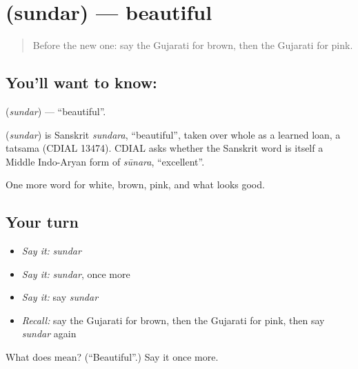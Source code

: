 \section[\texorpdfstring{\gu{સુંદર} (sundar)}{સુંદર (sundar)}]{ (sundar) — beautiful}

\label{lesson:GU-C71-beautiful}



\begin{quote}
Before the new one: say the Gujarati for brown, then the Gujarati for pink.
\end{quote}

\subsection*{You'll want to know: }
\textbf{} (\emph{sundar}) — \textquotedblleft{}beautiful\textquotedblright{}.

\begin{cousinweb}
\textbf{} (\emph{sundar}) is Sanskrit \emph{sundara}, \textquotedblleft{}beautiful\textquotedblright{}, taken over whole as a learned loan, a tatsama (CDIAL 13474). CDIAL asks whether the Sanskrit word is itself a Middle Indo-Aryan form of \emph{sūnara}, \textquotedblleft{}excellent\textquotedblright{}.
\end{cousinweb}

\begin{grammarlens}[title={What you've built}]
One more word for white, brown, pink, and what looks good.
\end{grammarlens}

\subsection*{Your turn}
\begin{itemize}
\raggedright
  \item \emph{Say it:} \emph{sundar}
  \item \emph{Say it:} \emph{sundar}, once more
  \item \emph{Say it:} say \emph{sundar}
  \item \emph{Recall:} say the Gujarati for brown, then the Gujarati for pink, then say \emph{sundar} again
\end{itemize}

\begin{tcolorbox}[breakable,colback=teal!4,colframe=teal!35!black,title={Before you move on}]
What does  mean? (\textquotedblleft{}Beautiful\textquotedblright{}.) Say it once more.
\end{tcolorbox}
